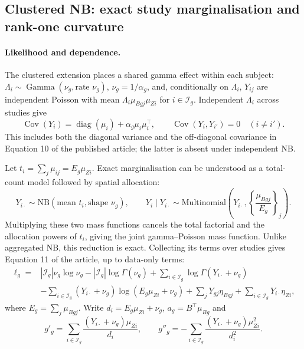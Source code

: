 \documentclass[11pt,a4paper]{article}
\newcommand{\diag}{\operatorname{diag}}
\newcommand{\Cov}{\operatorname{Cov}}
\numberwithin{equation}{section}
\begin{document}
\subsection{Clustered NB: exact study marginalisation and rank-one curvature}\label{sec:clustered}
\paragraph{Likelihood and dependence.}
The clustered extension places a shared gamma effect within each subject:
$\Lambda_i\sim\operatorname{Gamma}(\nu_g,\text{rate }\nu_g)$,
$\nu_g=1/\alpha_g$, and, conditionally on $\Lambda_i$,
$Y_{ij}$ are independent Poisson with mean $\Lambda_i\mu_{Bgj}\mu_{Zi}$ for
$i\in\mathcal I_g$.
Independent $\Lambda_i$ across studies give
\begin{equation}\label{eq:cluster-covariance}
 \Cov(Y_i)=\diag(\mu_i)+\alpha_g\mu_i\mu_i^\top,\qquad
 \Cov(Y_i,Y_{i'})=0\quad(i\ne i').
\end{equation}
This includes both the diagonal variance and the off-diagonal covariance
in Equation 10 of the published article; the latter is absent under
independent NB.

Let $t_i=\sum_j\mu_{ij}=E_g\mu_{Zi}$. Exact marginalisation can be understood
as a total-count model followed by spatial allocation:
\begin{equation}\label{eq:cluster-factorisation}
 Y_{i\cdot}\sim\mathrm{NB}(\text{mean }t_i,\text{shape }\nu_g),\qquad
 Y_i\mid Y_{i\cdot}\sim
 \mathrm{Multinomial}\left(Y_{i\cdot},
                   \left\{\frac{\mu_{Bgj}}{E_g}\right\}_j\right).
\end{equation}
Multiplying these two mass functions cancels the total factorial and the
allocation powers of $t_i$, giving the joint gamma--Poisson mass function.
Unlike aggregated NB, this reduction is exact. Collecting its terms over
studies gives Equation 11 of the article, up to data-only terms:
\begin{equation}
 \begin{split}
 \ell_g={}&|\mathcal I_g|\nu_g\log\nu_g-|\mathcal I_g|\log\Gamma(\nu_g)
 +\sum_{i\in\mathcal I_g}\log\Gamma(Y_{i\cdot}+\nu_g)\\
 &-\sum_{i\in\mathcal I_g}(Y_{i\cdot}+\nu_g)\log(E_g\mu_{Zi}+\nu_g)
 +\sum_jY_{gj}\eta_{Bgj}+\sum_{i\in\mathcal I_g}Y_{i\cdot}\eta_{Zi},
 \end{split}
\end{equation}
where $E_g=\sum_j\mu_{Bgj}$. Write
$d_i=E_g\mu_{Zi}+\nu_g$, $a_g=B^\top\mu_{Bg}$ and
\[
 g'_g=\sum_{i\in\mathcal I_g}\frac{(Y_{i\cdot}+\nu_g)\mu_{Zi}}{d_i},
 \qquad
 g''_g=-\sum_{i\in\mathcal I_g}\frac{(Y_{i\cdot}+\nu_g)\mu_{Zi}^2}{d_i^2}.
\]
\end{document}
